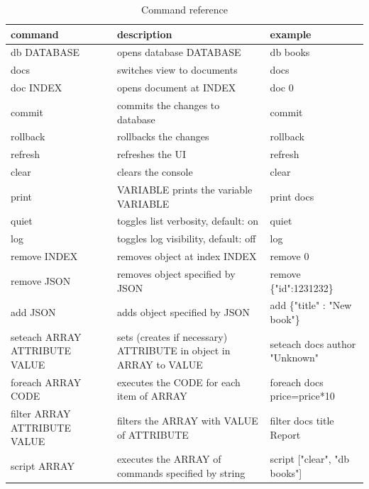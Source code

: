 \documentclass[10pt,a4paper,oneside]{report}
\begin{document}
\begin{table}
\centering
\begin{tabularx}{\textwidth}{ | l | X | l | }
\hline
\textbf{command} & \textbf{description} & \textbf{example} \\ \hline 
db DATABASE	& opens database DATABASE & db books \\ \hline
docs & switches view to documents & docs \\ \hline
doc INDEX & opens document at INDEX & doc 0 \\ \hline
commit & commits the changes to database & commit \\ \hline
rollback & rollbacks the changes & rollback \\ \hline
refresh & refreshes the UI & refresh \\ \hline
clear & clears the console & clear \\ \hline
print & VARIABLE	prints the variable VARIABLE & print docs \\ \hline
quiet & toggles list verbosity, default: on & quiet \\ \hline
log & toggles log visibility, default: off & log \\ \hline
remove INDEX & removes object at index INDEX & remove 0 \\ \hline
remove JSON & removes object specified by JSON & remove  \{"id":1231232\} \\ \hline
add JSON & adds object specified by JSON & add \{"title" : "New book"\} \\ \hline
seteach ARRAY ATTRIBUTE VALUE & sets (creates if necessary) ATTRIBUTE in object in ARRAY to VALUE & seteach docs author "Unknown" \\ \hline
foreach ARRAY CODE & executes the CODE for each item of ARRAY & foreach docs price=price*10 \\ \hline
filter ARRAY ATTRIBUTE VALUE & filters the ARRAY with VALUE of ATTRIBUTE & filter docs  title Report \\ \hline
script ARRAY & executes the ARRAY of commands specified by string & script ["clear", "db books"] \\ \hline
\end{tabularx}
\caption{Command reference}
\label{table:command-reference}
\end{table}




%
\end{document}
